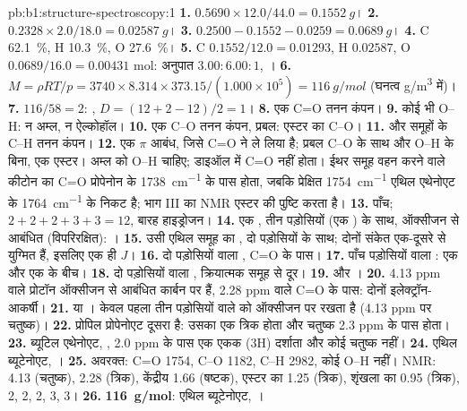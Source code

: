 \begin{solution}{pb:b1:structure-spectroscopy:1}
\textbf{1.} $0.5690 \times 12.0/44.0 = \qty{0.1552}{g}$।
\textbf{2.} $0.2328 \times 2.0/18.0 = \qty{0.02587}{g}$।
\textbf{3.} $0.2500 - 0.1552 - 0.0259 = \qty{0.0689}{g}$।
\textbf{4.} C \qty{62.1}{\percent}, H \qty{10.3}{\percent}, O
\qty{27.6}{\percent}।
\textbf{5.} C $0.1552/12.0 = 0.01293$, H $0.02587$, O $0.0689/16.0 =
0.00431$ mol: अनुपात $3.00 : 6.00 : 1$, ।
\textbf{6.} $M = \rho RT/p = 3740 \times 8.314 \times 373.15/(1.000 \times 10^5) =
\qty{116}{g/mol}$ (घनत्व \unit{g/m^3} में)।
\textbf{7.} $116/58 = 2$: , $D = (12 + 2 - 12)/2 = 1$।
\textbf{8.} एक C=O तनन कंपन।
\textbf{9.} कोई भी O--H: न अम्ल, न ऐल्कोहॉल।
\textbf{10.} एक C--O तनन कंपन, प्रबल: एस्टर का C--O।
\textbf{11.}  और  समूहों के C--H तनन कंपन।
\textbf{12.} एक $\pi$ आबंध, जिसे C=O ने ले लिया है; प्रबल C--O के साथ और
O--H के बिना, एक एस्टर। अम्ल को O--H चाहिए; डाइऑल में C=O नहीं होता। ईथर समूह
वहन करने वाले कीटोन का C=O प्रोपेनोन के \qty{1738}{cm^{-1}} के पास होता,
जबकि प्रेक्षित \qty{1754}{cm^{-1}} एथिल एथेनोएट के
\qty{1764}{cm^{-1}} के निकट है; भाग III का NMR एस्टर की
पुष्टि करता है।
\textbf{13.} पाँच; $2 + 2 + 2 + 3 + 3 = 12$, बारह हाइड्रोजन।
\textbf{14.} एक , तीन पड़ोसियों (एक ) के साथ, ऑक्सीजन से
आबंधित (विपरिरक्षित): ।
\textbf{15.} उसी एथिल समूह का , दो पड़ोसियों के साथ; दोनों
संकेत एक-दूसरे से युग्मित हैं, इसलिए एक ही $J$।
\textbf{16.} दो पड़ोसियों वाला , C=O के पास।
\textbf{17.} पाँच पड़ोसियों वाला : एक  और एक
 के बीच।
\textbf{18.} दो पड़ोसियों वाला , क्रियात्मक समूह से दूर।
\textbf{19.}  और ।
\textbf{20.} 4.13 ppm वाले प्रोटॉन ऑक्सीजन से आबंधित कार्बन पर हैं,
2.28 ppm वाले C=O के पास: दोनों इलेक्ट्रॉन-आकर्षी।
\textbf{21.}  या । केवल
पहला तीन पड़ोसियों वाले  को ऑक्सीजन पर रखता है (4.13 ppm पर
चतुष्क)।
\textbf{22.} प्रोपिल प्रोपेनोएट दूसरा है: उसका  एक
त्रिक होता और चतुष्क 2.3 ppm के पास होता।
\textbf{23.} ब्यूटिल एथेनोएट, , 2.0 ppm के पास एक एकक (3H)
दर्शाता और कोई चतुष्क नहीं।
\textbf{24.} एथिल ब्यूटेनोएट, ।
\textbf{25.} अवरक्त: C=O 1754, C--O 1182, C--H 2982, कोई O--H नहीं। NMR: 
4.13 (चतुष्क),  2.28 (त्रिक), केंद्रीय  1.66 (षष्टक), एस्टर का
 1.25 (त्रिक), शृंखला का  0.95 (त्रिक),  2, 2, 2, 3, 3।
\textbf{26.} \textbf{\qty{116}{g/mol}}: एथिल ब्यूटेनोएट, ।
\end{solution}
